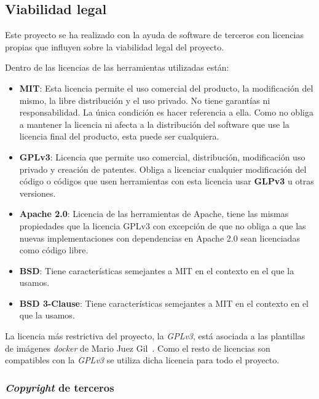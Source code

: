\subsection{Viabilidad legal}

Este proyecto se ha realizado con la ayuda de software de terceros con licencias propias que influyen sobre la viabilidad legal del proyecto.

Dentro de las licencias de las herramientas utilizadas están:
\begin{itemize}
		\item \textbf{MIT}: Esta licencia permite el uso comercial del producto, la modificación del mismo, la libre distribución y el uso privado. No tiene garantías ni responsabilidad. La única condición es hacer referencia a ella. Como no obliga a mantener la licencia ni afecta a la distribución del software que use la licencia final del producto, esta puede ser cualquiera.
		
		\item \textbf{GPLv3}: Licencia que permite uso comercial, distribución, modificación uso privado y creación de patentes. Obliga a licenciar
cualquier modificación del código o códigos que usen herramientas con esta licencia usar \textbf{GLPv3} u otras versiones.
		
		\item \textbf{Apache 2.0}: Licencia de las herramientas de Apache, tiene las mismas propiedades que la licencia GPLv3 con excepción de que no obliga a que las nuevas implementaciones con dependencias en Apache 2.0 sean licenciadas como código libre.

		\item \textbf{BSD}: Tiene características semejantes a MIT en el contexto en el que la usamos.
		
		\item \textbf{BSD 3-Clause}: Tiene características semejantes a MIT en el contexto en el que la usamos.
\end{itemize}

La licencia más restrictiva del proyecto, la \textit{GPLv3}, está asociada a las plantillas de imágenes \textit{docker} de Mario Juez Gil~\cite{juez2019docker}. Como el resto de licencias son compatibles con la \textit{GPLv3} se utiliza dicha licencia para todo el proyecto.

\subsubsection{\textit{Copyright} de terceros}


